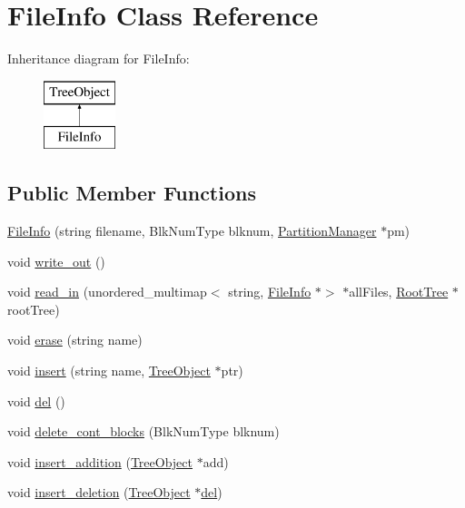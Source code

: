 \hypertarget{classFileInfo}{}\section{File\+Info Class Reference}
\label{classFileInfo}
Inheritance diagram for File\+Info\+:\begin{figure}[H]
\begin{center}
\leavevmode
\includegraphics[height=2.000000cm]{dd/da2/classFileInfo}
\end{center}
\end{figure}
\subsection*{Public Member Functions}
\begin{DoxyCompactItemize}
\item 
\mbox{\hyperlink{classFileInfo_a3586bb4f50c4a0f63ff4ea0a1e56ce9c}{File\+Info}} (string filename, Blk\+Num\+Type blknum, \mbox{\hyperlink{classPartitionManager}{Partition\+Manager}} $\ast$pm)
\item 
void \mbox{\hyperlink{classFileInfo_a8e835f000ddfd0f1097ccfa7e7801a09}{write\+\_\+out}} ()
\item 
void \mbox{\hyperlink{classFileInfo_a2bf60d4be97347f3d7a15cf839afca7d}{read\+\_\+in}} (unordered\+\_\+multimap$<$ string, \mbox{\hyperlink{classFileInfo}{File\+Info}} $\ast$$>$ $\ast$all\+Files, \mbox{\hyperlink{classRootTree}{Root\+Tree}} $\ast$root\+Tree)
\item 
void \mbox{\hyperlink{classFileInfo_ae058242283d3317eaf2b79428e6137f6}{erase}} (string name)
\item 
void \mbox{\hyperlink{classFileInfo_ad93a84b63e417b07aa68b619051ab746}{insert}} (string name, \mbox{\hyperlink{classTreeObject}{Tree\+Object}} $\ast$ptr)
\item 
void \mbox{\hyperlink{classFileInfo_a2ca34d945ed1208f227a249ba72ee427}{del}} ()
\item 
void \mbox{\hyperlink{classFileInfo_a8c6b58cb9f7e9978064291ef81380e01}{delete\+\_\+cont\+\_\+blocks}} (Blk\+Num\+Type blknum)
\item 
void \mbox{\hyperlink{classFileInfo_a7f788f31521c535646eebfa9959bbb24}{insert\+\_\+addition}} (\mbox{\hyperlink{classTreeObject}{Tree\+Object}} $\ast$add)
\item 
void \mbox{\hyperlink{classFileInfo_a278136b1d68f55dc56a4be807076fc0d}{insert\+\_\+deletion}} (\mbox{\hyperlink{classTreeObject}{Tree\+Object}} $\ast$\mbox{\hyperlink{classFileInfo_a2ca34d945ed1208f227a249ba72ee427}{del}})
\end{DoxyCompactItemize}
